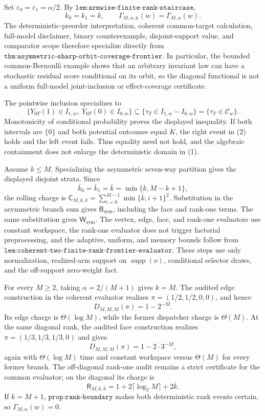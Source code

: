 Set \(\varepsilon_0=\varepsilon_1=\alpha/2\). By \(\texttt{lem:armwise-finite-rank-staircase}\),
\[
k_0=k_1=k,\qquad \Gamma_{M,\alpha,\boldsymbol\varepsilon}(w)=\Gamma_{M,\alpha}(w).
\tag{1}
\]
The deterministic-preorder interpretation, coherent common-target calculation, full-model disclaimer, binary counterexample, disjoint-support value, and comparator scope therefore specialize directly from \(\texttt{thm:asymmetric-sharp-orbit-coverage-frontier}\). In particular, the bounded common-Bernoulli example shows that an arbitrary invariant law can have a stochastic residual score conditional on its orbit, so the diagonal functional is not a uniform full-model joint-inclusion or effect-coverage certificate.

The pointwise inclusion specializes to
\[
\{Y_{0T}(1)\in I_{1,w},\ Y_{0T}(0)\in I_{0,w}\}\subseteq\{\tau_T\in I_{1,w}-I_{0,w}\}=\{\tau_T\in\mathcal C_w\}.
\tag{2}
\]
Monotonicity of conditional probability proves the displayed inequality. If both intervals are \(\{0\}\) and both potential outcomes equal \(K\), the right event in (2) holds and the left event fails. Thus equality need not hold, and the algebraic containment does not enlarge the deterministic domain in (1).

Assume \(k\le M\). Specializing the asymmetric seven-way partition gives the displayed disjoint strata. Since
\[
\bar k_0=\bar k_1=\bar k=\min\{k,M-k+1\},
\]
the rolling charge is \(\mathsf C_{M,k,k}=\sum_{i=0}^{M-1}\min\{\bar k,i+1\}^2\). Substitution in the asymmetric branch sum gives \(\mathsf B_{\mathrm{sym}}\), including the face and rank-one terms. The same substitution gives \(\mathsf W_{\mathrm{sym}}\). The vertex, edge, face, and rank-one evaluators use constant workspace, the rank-one evaluator does not trigger factorial preprocessing, and the adaptive, uniform, and memory bounds follow from \(\texttt{lem:coherent-two-finite-rank-frontier-evaluator}\). These steps use only normalization, realized-arm support on \(\operatorname{supp}(\nu)\), conditional selector draws, and the off-support zero-weight fact.

For every \(M\ge2\), taking \(\alpha=2/(M+1)\) gives \(k=M\). The audited edge construction in the coherent evaluator realizes \(\pi=(1/2,1/2,0,0)\), and hence
\[D_{M,M,M}(\pi)=1-2^{-M}.\]
Its edge charge is \(\Theta(\log M)\), while the former dispatcher charge is \(\Theta(M)\). At the same diagonal rank, the audited face construction realizes \(\pi=(1/3,1/3,1/3,0)\) and gives
\[D_{M,M,M}(\pi)=1-2\cdot3^{-M},\]
again with \(\Theta(\log M)\) time and constant workspace versus \(\Theta(M)\) for every former branch. The off-diagonal rank-one audit remains a strict certificate for the common evaluator; on the diagonal its charge is
\[\mathsf R_{M,k,k}=1+2\lceil\log_2M\rceil+2\bar k.\]
If \(k=M+1\), \(\texttt{prop:rank-boundary}\) makes both deterministic rank events certain, so \(\Gamma_{M,\alpha}(w)=0\).

